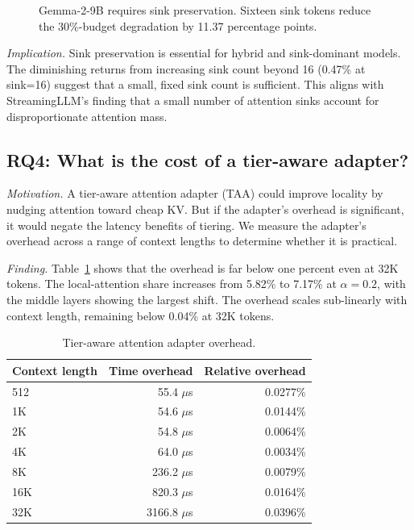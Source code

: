 \documentclass[11pt]{article}
\newcommand{\taa}{TAA}
\newcommand{\pct}{\%}
\theoremstyle{definition}
\theoremstyle{plain}
\begin{document}
\begin{figure}[t]
\centering
{}
\caption{Gemma-2-9B requires sink preservation.  Sixteen sink tokens reduce the 30\pct{}-budget degradation by 11.37 percentage points.}
\label{fig:gemma-sink}
\end{figure}

\emph{Implication.}  Sink preservation is essential for hybrid and sink-dominant models.  The diminishing returns from increasing sink count beyond 16 (0.47\pct{} at sink=16) suggest that a small, fixed sink count is sufficient.  This aligns with StreamingLLM's finding that a small number of attention sinks account for disproportionate attention mass.

\subsection{RQ4: What is the cost of a tier-aware adapter?}
\label{sec:rq4}

\emph{Motivation.}  A tier-aware attention adapter (\taa) could improve locality by nudging attention toward cheap KV.  But if the adapter's overhead is significant, it would negate the latency benefits of tiering.  We measure the adapter's overhead across a range of context lengths to determine whether it is practical.

\emph{Finding.}  Table~\ref{tab:taa} shows that the overhead is far below one percent even at 32K tokens.  The local-attention share increases from 5.82\pct{} to 7.17\pct{} at $\alpha=0.2$, with the middle layers showing the largest shift.  The overhead scales sub-linearly with context length, remaining below 0.04\pct{} at 32K tokens.

\begin{table}[t]
\centering
\caption{Tier-aware attention adapter overhead.}
\label{tab:taa}
\small
\begin{tabular}{lrr}
\toprule
Context length & Time overhead & Relative overhead \\
\midrule
512 & 55.4 $\mu$s & 0.0277\pct{} \\
1K & 54.6 $\mu$s & 0.0144\pct{} \\
2K & 54.8 $\mu$s & 0.0064\pct{} \\
4K & 64.0 $\mu$s & 0.0034\pct{} \\
8K & 236.2 $\mu$s & 0.0079\pct{} \\
16K & 820.3 $\mu$s & 0.0164\pct{} \\
32K & 3166.8 $\mu$s & 0.0396\pct{} \\
\bottomrule
\end{tabular}
\end{table}
\end{document}
